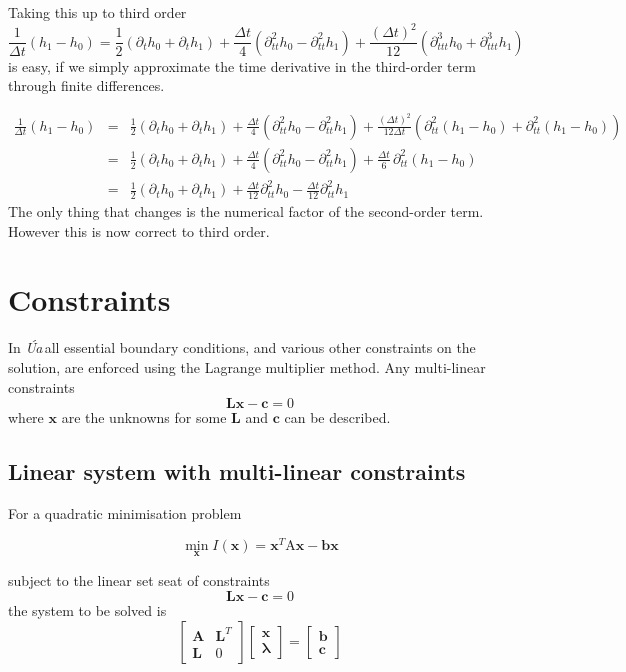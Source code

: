 \documentclass[10pt,a4paper]{book}
\newcommand{\p}{\partial}
\newcommand{\Ua}{\textsl{\'Ua}\,}
\begin{document}
Taking this up to third order
\[
\frac{1}{\Delta t}(h_1-h_0)= \frac{1}{2} (\p_t h_0+ \p_t h_1) + \frac{\Delta t}{4} (\p^2_{tt} h_0 - \p^2_{tt} h_1)
+\frac{(\Delta t)^2}{12} ( \p^3_{ttt} h_0 + \p^3_{ttt} h_1) 
\]
is easy, if we simply approximate the time derivative in the third-order term through finite differences.

\begin{eqnarray*}
\frac{1}{\Delta t}(h_1-h_0)&=& 
\frac{1}{2} (\p_t h_0+ \p_t h_1) + \frac{\Delta t}{4} (\p^2_{tt} h_0 - \p^2_{tt} h_1) +\frac{(\Delta t)^2}{12 \Delta t} ( \p^2_{tt} (h_1-h_0) + \p^2_{tt} (h_1-h_0)) \\
&=& \frac{1}{2} (\p_t h_0+ \p_t h_1) + \frac{\Delta t}{4} (\p^2_{tt} h_0 - \p^2_{tt} h_1) +\frac{\Delta t}{6} \,\p^2_{tt} (h_1-h_0)  \\
&=& \frac{1}{2} (\p_t h_0+ \p_t h_1) + \frac{\Delta t}{12} \p^2_{tt} h_0 - \frac{\Delta t}{12} \p^2_{tt} h_1
\end{eqnarray*}
The only thing that changes is the numerical factor of the second-order term. However this is now correct to third order.






\chapter{Constraints}

In \Ua all essential boundary conditions, and various other constraints on the solution, are
enforced using the Lagrange multiplier method. Any multi-linear constraints
\[
\bm{L} \bm{x} -\bm{c}=0
\]
where $\bm{x}$ are the unknowns for some $\bm{L}$ and $\bm{c}$ can be
described.

\section{Linear system with multi-linear constraints}
For a quadratic minimisation problem 

\[
\min_{\bm{x}} I(\bm{x})=\bm{x}^T \mathrm{A} \bm{x} - \bm{b} \bm{x}
\]

subject to the linear set seat of constraints
\[
\bm{L} \bm{x} -\bm{c}=0
\]
the system to be solved is
\[
\left [ \begin{array}{cc}
\bm{A} & \bm{L}^T  \\
\bm{L} & 0 
\end{array} \right ]
\left [ \begin{array}{c}
\bm{x} \\
\bm{\lambda}
\end{array} \right ]
=\left [ \begin{array}{c}
\bm{b} \\
\bm{c}
\end{array} \right ]
\]
\end{document}
